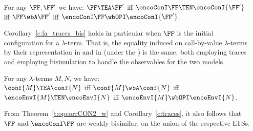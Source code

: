\begin{corollary}
\label{c:fa_traces_bis}
For any $\FF,\FF'$ we have:
 $\FF\TEA \FF'$ iff 
$ \encoConI \FF \TEN \encoConI {\FF'}$
iff
 $\FF\wbA \FF'$ iff 
$ \encoConI \FF \wbOPI \encoConI {\FF'}$.
 \end{corollary} 

\noindent
Corollary~\ref{c:fa_traces_bis}  holds in particular when $\FF$ is the initial configuration
for a $\lambda$-term.  That is, 
the equality induced on call-by-value $\lambda$-terms by  
their representation in \AOGS and in \piI 
(under the \opLTS) is the same, both employing traces and employing bisimulation 
to handle   the observables for the two
models. 
\begin{corollary}
\label{c:OGS_opLTSpiI}
For any $\lambda$-terms $M,N$,  we have: 
\\
$\conf{M} \TEA \conf {N}$ iff
$\conf{M} \wbA \conf {N}$ iff
$\encoEnvI {{M} } \TEN\encoEnvI {{N}}$ iff 
$\encoEnvI {{M}} \wbOPI \encoEnvI {{N}}$. 
\end{corollary} 

\noindent
From Theorem~\ref{t:opcorrCON2_w} and Corollary~\ref{c:traces}, it also follows that  $\FF$ and
$\encoConI \FF$ are weakly bisimilar,  on the union of the respective  LTSs.
